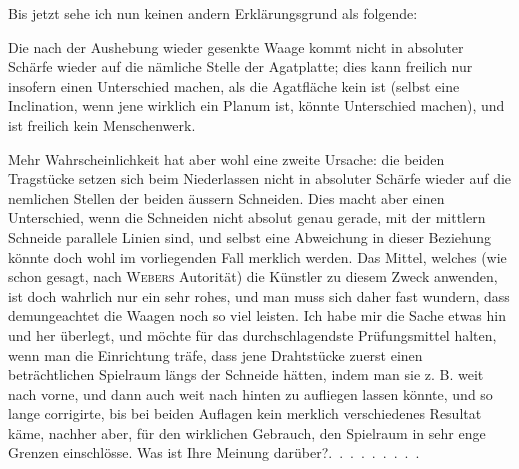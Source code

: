 \par\noindent\hspace*{\parindent}Bis jetzt sehe ich nun keinen andern Erklärungsgrund als folgende:
\begin{list}{}{\setlength{\leftmargin}{2.5em}\setlength{\labelwidth}{1.3em}\setlength{\labelsep}{.4em}\setlength{\itemsep}{0pt}\setlength{\parsep}{0pt}\setlength{\topsep}{0pt}}
\item[1)] Die nach der Aushebung wieder gesenkte Waage kommt nicht in absoluter
Schärfe wieder auf die nämliche Stelle der Agatplatte; dies
kann freilich nur insofern einen Unterschied machen, als die Agatfläche
kein  ist (selbst eine Inclination,
wenn jene wirklich ein Planum ist, könnte  Unterschied
machen), und  ist freilich kein Menschenwerk.
\item[2)] Mehr Wahrscheinlichkeit hat aber wohl eine zweite Ursache: die
beiden Tragstücke setzen sich beim Niederlassen nicht in absoluter
Schärfe wieder auf die nemlichen Stellen der beiden äussern Schneiden.
Dies macht aber einen Unterschied, wenn die Schneiden nicht absolut
genau gerade, mit der mittlern Schneide parallele Linien sind, und
selbst eine  Abweichung in dieser Beziehung könnte doch
wohl im vorliegenden Fall merklich werden. Das Mittel, welches (wie
schon gesagt, nach \textsc{Webers} Autorität) die Künstler zu diesem Zweck
\clearpage{}
\noindent anwenden, ist doch wahrlich nur ein sehr rohes, und man muss sich
daher fast wundern, dass demungeachtet die Waagen noch so viel
leisten. Ich habe mir die Sache etwas hin und her überlegt, und
möchte für das durchschlagendste Prüfungsmittel halten, wenn man
die Einrichtung träfe, dass jene Drahtstücke 
zuerst einen beträchtlichen Spielraum längs der Schneide hätten, indem
man sie z. B.  weit nach vorne, und dann auch weit nach
hinten zu aufliegen lassen könnte, und so lange corrigirte, bis bei
beiden Auflagen kein merklich verschiedenes Resultat käme, nachher
aber, für den wirklichen Gebrauch, den Spielraum in sehr enge
Grenzen einschlösse. Was ist Ihre Meinung darüber?\quad .\ .\ .\ .\ .\ .\ .\ .\ .
\end{list}
\clearpage\endgroup
